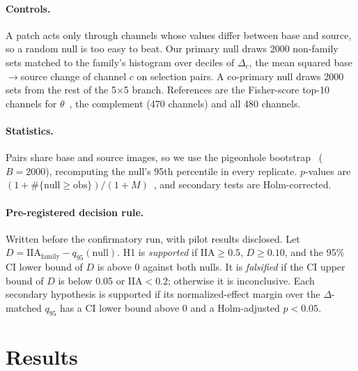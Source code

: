 \documentclass[11pt]{article}
\newcommand{\iia}{\mathrm{IIA}}
\begin{document}
\paragraph{Controls.}
A patch acts only through channels whose values differ between base and source, so a random null is too easy to beat. Our primary null draws 2000 non-family sets matched to the family's histogram over deciles of $\Delta_c$, the mean squared base$\to$source change of channel $c$ on selection pairs. A co-primary null draws 2000 sets from the rest of the 5$\times$5 branch. References are the Fisher-score top-10 channels for $\theta$~\cite{gu2011fisher,baeumel2025modular}, the complement (470 channels) and all 480 channels.

\paragraph{Statistics.}
Pairs share base and source images, so we use the pigeonhole bootstrap~\cite{owen2007pigeonhole} ($B=2000$), recomputing the null's 95th percentile in every replicate. $p$-values are $(1+\#\{\text{null}\ge\text{obs}\})/(1+M)$~\cite{phipson2010permutation}, and secondary tests are Holm-corrected.

\paragraph{Pre-registered decision rule.}
Written before the confirmatory run, with pilot results disclosed. Let $D=\iia_{\text{family}}-q_{95}(\text{null})$. H1 is \emph{supported} if $\iia\ge0.5$, $D\ge0.10$, and the 95\% CI lower bound of $D$ is above 0 against both nulls. It is \emph{falsified} if the CI upper bound of $D$ is below 0.05 or $\iia<0.2$; otherwise it is inconclusive. Each secondary hypothesis is supported if its normalized-effect margin over the $\Delta$-matched $q_{95}$ has a CI lower bound above 0 and a Holm-adjusted $p<0.05$.

\section{Results}
\label{sec:results}
\end{document}
